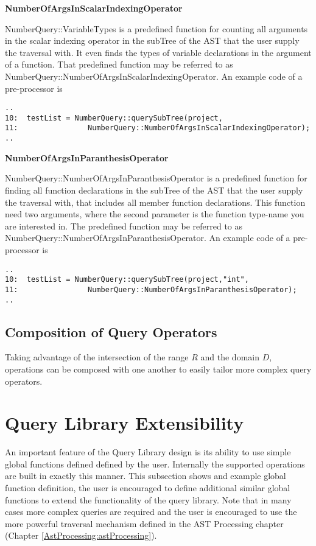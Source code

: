{\textbf{NumberOfArgsInScalarIndexingOperator}

NumberQuery::VariableTypes is a predefined function for counting all
arguments in the scalar indexing operator in the subTree of the AST 
that the user supply the traversal with. It even finds the types of variable
declarations in the argument of a function. That predefined function
may be referred to as
NumberQuery::NumberOfArgsInScalarIndexingOperator. 
An example code of a pre-processor is
\begin{verbatim}
..
10:  testList = NumberQuery::querySubTree(project,
11:                NumberQuery::NumberOfArgsInScalarIndexingOperator);
..
\end{verbatim}

\textbf{NumberOfArgsInParanthesisOperator}

NumberQuery::NumberOfArgsInParanthesisOperator is a predefined function for finding
all function declarations in the subTree of the AST that the user
supply the traversal with, that includes all member function
declarations. This function need two arguments, where the second
parameter is the function type-name you are interested in. The
predefined function may be referred to as
NumberQuery::NumberOfArgsInParanthesisOperator. 
An example code of a pre-processor is
\begin{verbatim}
..
10:  testList = NumberQuery::querySubTree(project,"int", 
11:                NumberQuery::NumberOfArgsInParanthesisOperator);
..
\end{verbatim}

\subsection{Composition of Query Operators}
    Taking advantage of the intersection of the range $R$ and the domain $D$,
operations can be composed with one another to easily tailor more complex
query operators.

\section{Query Library Extensibility}
   An important feature of the Query Library design is its ability
to use simple global functions defined defined by the user.  Internally
the supported operations are built in exactly this manner.  This subsection
shows and example global function definition, the user is encouraged to
define additional similar global functions to extend the functionality 
of the query library.  Note that in many cases more complex queries are
required and the user is encouraged to use the more powerful traversal
mechanism defined in the AST Processing chapter 
(Chapter \ref{AstProcessing:astProcessing}).

}

